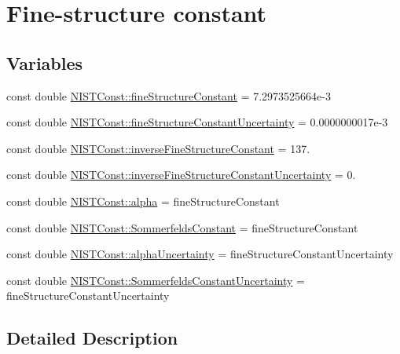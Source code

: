 \hypertarget{group___n_i_s_t_const-_fine_structure_constant}{}\section{Fine-\/structure constant}
\label{group___n_i_s_t_const-_fine_structure_constant}
\subsection*{Variables}
\begin{DoxyCompactItemize}
\item 
const double \hyperlink{group___n_i_s_t_const-_fine_structure_constant_ga0f1ddaca2627b7253ed177aa1b074724}{N\+I\+S\+T\+Const\+::fine\+Structure\+Constant} = 7.\+2973525664e-\/3
\item 
const double \hyperlink{group___n_i_s_t_const-_fine_structure_constant_ga18067d14fb16cc6418212812405e6496}{N\+I\+S\+T\+Const\+::fine\+Structure\+Constant\+Uncertainty} = 0.\+0000000017e-\/3
\item 
const double \hyperlink{group___n_i_s_t_const-_fine_structure_constant_gaa4cd257f5376577cf0331e71dd952bb6}{N\+I\+S\+T\+Const\+::inverse\+Fine\+Structure\+Constant} = 137.
\item 
const double \hyperlink{group___n_i_s_t_const-_fine_structure_constant_gae26a4808ef23039e47ea7fc6d971d420}{N\+I\+S\+T\+Const\+::inverse\+Fine\+Structure\+Constant\+Uncertainty} = 0.
\item 
const double \hyperlink{group___n_i_s_t_const-_fine_structure_constant_gac2d74edeb9ba449e5e687a2cdbb139e9}{N\+I\+S\+T\+Const\+::alpha} = fine\+Structure\+Constant
\item 
const double \hyperlink{group___n_i_s_t_const-_fine_structure_constant_gaa076e4b419cd726407c8e2e9a44a381b}{N\+I\+S\+T\+Const\+::\+Sommerfelds\+Constant} = fine\+Structure\+Constant
\item 
const double \hyperlink{group___n_i_s_t_const-_fine_structure_constant_ga861407c811dfb66edddeb6ad55f5bdae}{N\+I\+S\+T\+Const\+::alpha\+Uncertainty} = fine\+Structure\+Constant\+Uncertainty
\item 
const double \hyperlink{group___n_i_s_t_const-_fine_structure_constant_ga4ad54e49e7d0bde74be46b2e97c25dfd}{N\+I\+S\+T\+Const\+::\+Sommerfelds\+Constant\+Uncertainty} = fine\+Structure\+Constant\+Uncertainty
\end{DoxyCompactItemize}


\subsection{Detailed Description}


